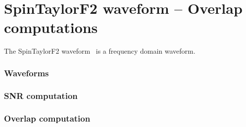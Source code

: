 
\chapter{SpinTaylorF2 waveform -- Overlap computations}

The SpinTaylorF2 waveform~\cite{Lundgren2014} is a frequency domain waveform.

\subsection{Waveforms}
\subsection{SNR computation}
\subsection{Overlap computation}








































